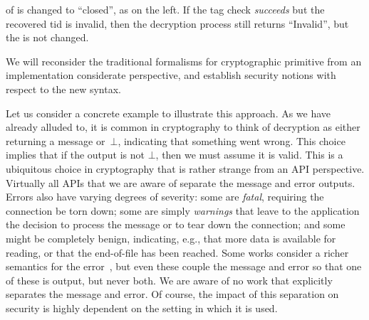 of  is changed to ``closed'', as on the left.
If the tag check \emph{succeeds} but the recovered tid is invalid,
then the decryption process still returns ``Invalid'', but the
 is not changed.


\begin{task}
{We will reconsider the traditional formalisms for cryptographic primitive from an implementation considerate perspective, and establish security notions with respect to the new syntax. }
\end{task}


Let us consider a concrete example to illustrate this approach.
%
As we have already alluded to, it is common in cryptography to think of
decryption as either returning a message or~$\bot$, indicating that something
went wrong. This choice implies that if the output is not $\bot$, then we must
assume it is valid.
%
This is a ubiquitous choice in cryptography that is rather strange from an API
perspective. Virtually all APIs that we are aware of separate the message and
error outputs. Errors also have varying degrees of severity: some are
\emph{fatal}, requiring the connection be torn down; some are simply
\emph{warnings} that leave to the application the decision to process the
message or to tear down the connection; and some might be completely benign,
indicating, e.g., that more data is available for reading, or that the
end-of-file has been reached.
%
Some works consider a richer semantics for the error~\cite{BDPS13,FPMG15}, but
even these couple the message and error so that one of these is output, but
never both.
%
We are aware of no work that explicitly separates the message and error. Of
course, the impact of this separation on security is highly dependent on the
setting in which it is used.

